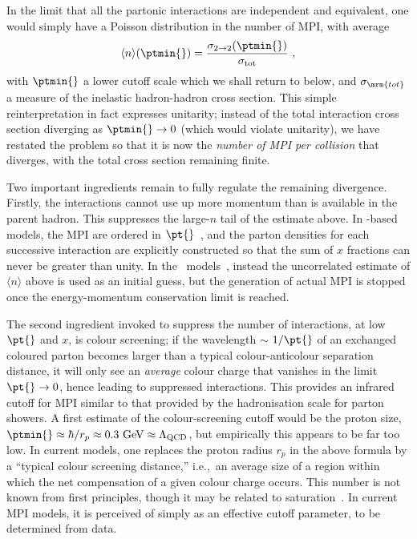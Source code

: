 In the limit that all the partonic interactions are independent and equivalent,
one would simply have a Poisson distribution in the number of MPI, with average
\begin{equation}
 \langle n \rangle(\ptmin{}) = \frac{\sigma_{2\to2}(\ptmin{})}
{\sigma_{\rm tot}} ~,
\end{equation}
with $\ptmin{}$ a lower cutoff scale which we shall return to below,
and $\sigma_\mrm{tot}$ a measure of the inelastic
hadron-hadron cross section. 
This simple reinterpretation in fact expresses unitarity;
instead of the total interaction cross
section diverging as $\ptmin{} \to 0$ (which would violate
unitarity), we have restated the problem so
that it is now the {\it number of MPI per collision} that
diverges, with the total cross section remaining finite. 

Two important ingredients remain to fully
regulate the remaining divergence. Firstly, the interactions cannot use up more
momentum than is available in the parent hadron. This 
 suppresses the large-$n$ tail of the estimate
above.
%
In \Py-based models, the
MPI are ordered in $\pt{}$~\cite{Sjostrand:1987su,Sjostrand:2004ef},
and the parton 
densities for each successive 
interaction are explicitly constructed so
that the sum of $x$ fractions can never be greater than unity. In
the \Hw\ models~\cite{Butterworth:1996zw,Bahr:2009ek}, instead the
uncorrelated estimate of  
$\langle n \rangle$ above is used as an initial guess, but
the generation of actual MPI is stopped once the
energy-momentum conservation limit is reached.

The second ingredient invoked to suppress the number of interactions,
at low $\pt{}$ and $x$, is colour screening; if 
the wavelength $\sim$ $1/\pt{}$ of an exchanged coloured parton 
becomes larger than a typical colour-anticolour separation distance, 
it will only see an {\it average} colour charge that vanishes in the limit
$\pt{} \to 0$, hence leading to suppressed interactions. 
This provides an infrared cutoff for
MPI similar to that provided by the hadronisation
scale for parton showers. 
A first estimate of the colour-screening cutoff would be 
the proton size, $
\ptmin{} \approx \hbar/r_{p} \approx
0.3~\mbox{GeV} \approx \Lambda_{\rm QCD}$, 
but empirically this appears to be far too low. In current models, one
replaces the proton radius $r_{p}$ in the above formula by a ``typical
colour screening distance,'' i.e.,\ an average size of a region within
which the net compensation of a given colour  
charge occurs. This number is not known from first 
principles, though it may be related to
saturation~\cite{Ryskin:2011qe}. In current MPI models, it is 
perceived of simply as an effective cutoff parameter, to be determined
from data. 

